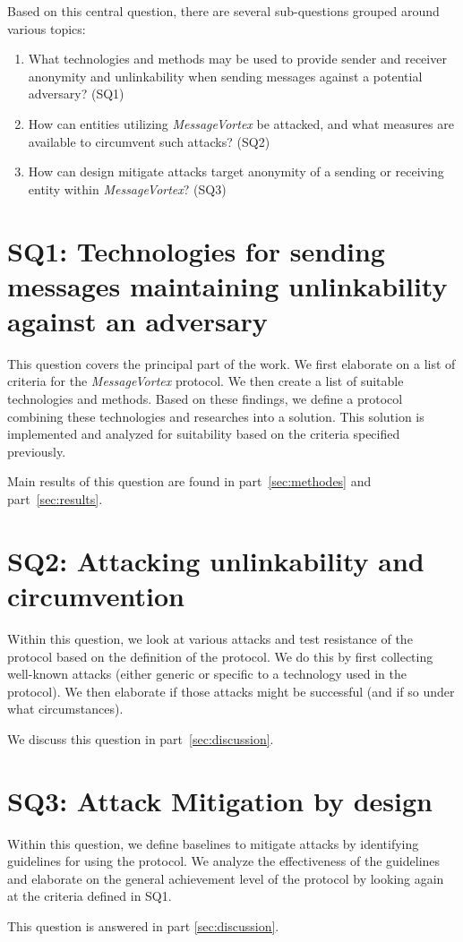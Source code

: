 Based on this central question, there are several sub-questions grouped around various topics:

\begin{enumerate}
	\item What technologies and methods may be used to provide sender and receiver anonymity and unlinkability when sending messages against a potential adversary? (SQ1)
	\item How can entities utilizing \emph{MessageVortex} be attacked, and what measures are available to circumvent such attacks? (SQ2)
	\item How can design mitigate attacks target anonymity of a sending or receiving entity within \emph{MessageVortex}? (SQ3)
\end{enumerate}

\section{SQ1: Technologies for sending messages maintaining unlinkability against an adversary}
This question covers the principal part of the work. We first elaborate on a list of criteria for the \emph{MessageVortex} protocol. We then create a list of suitable technologies and methods. Based on these findings, we define a protocol combining these technologies and researches into a solution. This solution is implemented and analyzed for suitability based on the criteria specified previously.

Main results of this question are found in part~\ref{sec:methodes} and part~\ref{sec:results}.

\section{SQ2: Attacking unlinkability and circumvention}
Within this question, we look at various attacks and test resistance of the protocol based on the definition of the protocol. We do this by first collecting well-known attacks (either generic or specific to a technology used in the protocol). We then elaborate if those attacks might be successful (and if so under what circumstances).

We discuss this question in part~\ref{sec:discussion}.

\section{SQ3: Attack Mitigation by design}
Within this question, we define baselines to mitigate attacks by identifying guidelines for using the protocol. We analyze the effectiveness of the guidelines and elaborate on the general achievement level of the protocol by looking again at the criteria defined in SQ1. 

This question is answered in part \ref{sec:discussion}.